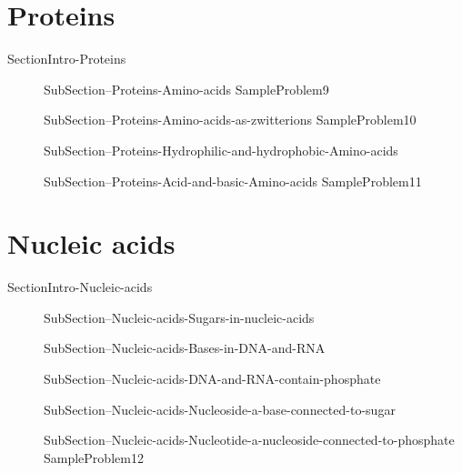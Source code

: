 \documentclass[main.tex]{subfiles}
\begin{document}
\section{ \faEnvira Proteins}
{SectionIntro-Proteins}
\sloppy\begin{description}
\item[] {SubSection--Proteins-Amino-acids}
  {SampleProblem9}
\item[] {SubSection--Proteins-Amino-acids-as-zwitterions}
  {SampleProblem10}
\item[] {SubSection--Proteins-Hydrophilic-and-hydrophobic-Amino-acids}
\item[] {SubSection--Proteins-Acid-and-basic-Amino-acids}
  {SampleProblem11}

\end{description}


\section{\faFire  Nucleic acids}{SectionIntro-Nucleic-acids}
\sloppy\begin{description}
\item[] {SubSection--Nucleic-acids-Sugars-in-nucleic-acids}
\item[] 
{SubSection--Nucleic-acids-Bases-in-DNA-and-RNA}
\item[] 
{SubSection--Nucleic-acids-DNA-and-RNA-contain-phosphate}
\item[] 
{SubSection--Nucleic-acids-Nucleoside-a-base-connected-to-sugar}
\item[] 
{SubSection--Nucleic-acids-Nucleotide-a-nucleoside-connected-to-phosphate}
  {SampleProblem12}
\end{description}
\end{document}
